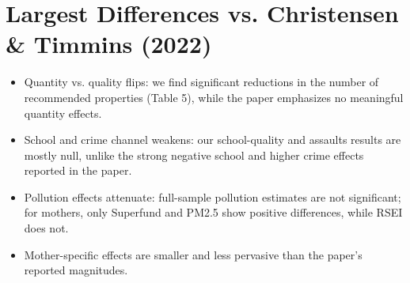 \documentclass[11pt]{article}
\begin{document}
\section*{Largest Differences vs. Christensen \& Timmins (2022)}
\begin{itemize}
  \item Quantity vs. quality flips: we find significant reductions in the number of recommended properties (Table 5), while the paper emphasizes no meaningful quantity effects.
  \item School and crime channel weakens: our school-quality and assaults results are mostly null, unlike the strong negative school and higher crime effects reported in the paper.
  \item Pollution effects attenuate: full-sample pollution estimates are not significant; for mothers, only Superfund and PM2.5 show positive differences, while RSEI does not.
  \item Mother-specific effects are smaller and less pervasive than the paper's reported magnitudes.
\end{itemize}











\end{document}
